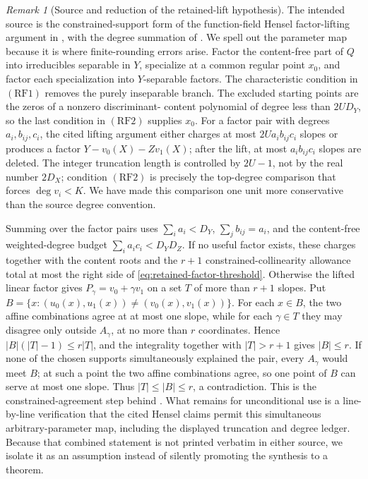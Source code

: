 \documentclass[11pt,a4paper]{amsart}
\numberwithin{equation}{section}
\theoremstyle{remark}
\newtheorem{remark}[remark]{Remark}
\newcommand{\abs}[1]{\lvert #1\rvert}
\begin{document}
\begin{remark}[Source and reduction of the retained-lift hypothesis]
The intended source is the constrained-support form of the function-field Hensel
factor-lifting argument in \cite[Secs.~5.2.5--5.2.7 and App.~A]{BCIKS20},
with the degree summation of \cite[Sec.~3.2]{BCHKS25}.  We spell out the
parameter map because it is where finite-rounding errors arise.
Factor the content-free part of \(Q\) into irreducibles separable in
\(Y\), specialize at a common regular point \(x_0\), and factor each
specialization into \(Y\)-separable factors.  The characteristic
condition in \((\mathrm{RF1})\) removes the purely inseparable branch.
The excluded starting points are the zeros of a nonzero discriminant-
content polynomial of degree less than \(2UD_Y\), so the last condition
in \((\mathrm{RF2})\) supplies \(x_0\).
For a factor pair with degrees \(a_i,b_{ij},c_i\), the cited lifting
argument either charges at most \(2U a_i b_{ij}c_i\) slopes or produces
a factor \(Y-v_0(X)-Zv_1(X)\); after the lift, at most
\(a_i b_{ij}c_i\) slopes are deleted.  The integer truncation length is
controlled by \(2U-1\), not by the real number \(2D_X\); condition
\((\mathrm{RF2})\) is precisely the top-degree comparison that forces
\(\deg v_i<K\).  We have made this comparison one unit more
conservative than the source degree convention.

Summing over the factor pairs uses
\(\sum_i a_i<D_Y\), \(\sum_j b_{ij}=a_i\), and the content-free
weighted-degree budget \(\sum_i a_ic_i<D_YD_Z\).  If no useful factor
exists, these charges together with the content roots and the
\(r+1\) constrained-collinearity allowance total at most the right side
of \eqref{eq:retained-factor-threshold}.  Otherwise the lifted linear
factor gives \(P_\gamma=v_0+\gamma v_1\) on a set
\(T\) of more than \(r+1\) slopes.  Put
\(B=\{x:(u_0(x),u_1(x))\ne(v_0(x),v_1(x))\}\).
For each \(x\in B\), the two affine combinations agree at at most one
slope, while for each \(\gamma\in T\) they may disagree only outside
\(A_\gamma\), at no more than \(r\) coordinates.  Hence
\(\abs B(\abs T-1)\le r\abs T\), and the integrality together with
\(\abs T>r+1\) gives \(\abs B\le r\).  If none of the chosen supports
simultaneously explained the pair, every \(A_\gamma\) would meet
\(B\); at such a point the two affine
combinations agree, so one point of \(B\) can serve at most one slope.
Thus \(\abs T\le\abs B\le r\), a contradiction.  This is the
constrained-agreement step behind \cite[Thm.~4.3]{BCHKS25}.
What remains for unconditional use is a line-by-line verification that the
cited Hensel claims permit this simultaneous arbitrary-parameter map,
including the displayed truncation and degree ledger.  Because that combined
statement is not printed verbatim in either source, we isolate it as an
assumption instead of silently promoting the synthesis to a theorem.
\end{remark}
\end{document}
